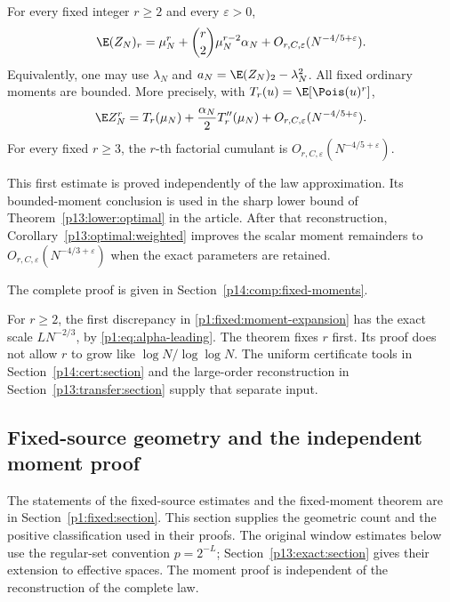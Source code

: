 \begin{theorem}
\label{p1:fixed:moments}
For every fixed integer \(r\ge2\) and every
\(\varepsilon>0\),
\begin{equation}
 \E(Z_N)_r
   =\mu_N^r+\binom r2\mu_N^{r-2}\alpha_N
       +O_{r,C,\varepsilon}(N^{-4/5+\varepsilon}).
 \label{p1:fixed:moment-expansion}
\end{equation}
Equivalently, one may use \(\lambda_N\) and
\(a_N=\E(Z_N)_2-\lambda_N^2\).
All fixed ordinary moments are bounded. More precisely,
with \(T_r(u)=\E[\Pois(u)^r]\),
\begin{equation}
 \E Z_N^r
    =T_r(\mu_N)+\frac{\alpha_N}{2}T_r''(\mu_N)
       +O_{r,C,\varepsilon}(N^{-4/5+\varepsilon}).
 \label{p1:fixed:ordinary}
\end{equation}
For every fixed \(r\ge3\), the \(r\)-th factorial
cumulant is \(O_{r,C,\varepsilon}(N^{-4/5+\varepsilon})\).
\end{theorem}

This first estimate is proved independently of the law approximation.
Its bounded-moment conclusion is used in the sharp lower bound of
Theorem~\ref{p13:lower:optimal} in the article.
After that reconstruction, Corollary~\ref{p13:optimal:weighted}
improves the scalar moment remainders to
\(O_{r,C,\varepsilon}(N^{-4/3+\varepsilon})\) when the exact
parameters are retained.

\noindent The complete proof is given in Section~\ref{p14:comp:fixed-moments}.


For \(r\ge2\), the first discrepancy in
\eqref{p1:fixed:moment-expansion} has the exact scale
\(L N^{-2/3}\), by \eqref{p1:eq:alpha-leading}.
The theorem fixes \(r\) first. Its proof does not
allow \(r\) to grow like \(\log N/\log\log N\).
The uniform certificate tools in Section~\ref{p14:cert:section} and the
large-order reconstruction in Section~\ref{p13:transfer:section}
supply that separate input.

\subsection{Fixed-source geometry and the independent moment proof}
\label{p14:comp:fixed}

The statements of the fixed-source estimates and the fixed-moment theorem
are in Section~\ref{p1:fixed:section}. This section supplies the geometric
count and the positive classification used in their proofs. The original
window estimates below use the regular-set convention $p=2^{-L}$;
Section~\ref{p13:exact:section} gives their extension to effective spaces.
The moment proof is independent of the reconstruction of the complete law.

